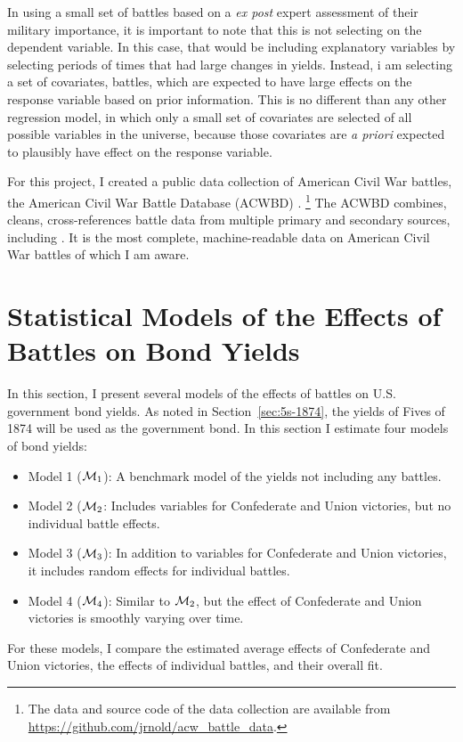 In using a small set of battles based on a \textit{ex post} expert assessment of their military importance, it is important to note that this is not selecting on the dependent variable.
In this case, that would be including explanatory variables by selecting periods of times that had large changes in yields.
Instead, i am selecting a set of covariates, \ie{} battles, which are expected to have large effects on the response variable based on prior information.
This is no different than any other regression model, in which only a small set of covariates are selected of all possible variables in the universe, because those covariates are \textit{a priori} expected to plausibly have effect on the response variable.

For this project, I created a public data collection of American Civil War battles, the American Civil War Battle Database (ACWBD) \parencite{Arnold2015b}.%
\footnote{The data and source code of the data collection are available from \url{https://github.com/jrnold/acw_battle_data}.}
The ACWBD combines, cleans, cross-references battle data from multiple primary and secondary sources, including \textcites{Phisterer1883}{Livermore1900}{Bodart1908}{dyer1908_war_rebel}{KennedyConservation1998}{CWSAC1993}{cwsac2012}.
It is the most complete, machine-readable data on American Civil War battles of which I am aware.



\section{Statistical Models of the Effects of Battles on Bond Yields}
\label{sec:model-war-events}

In this section, I present several models of the effects of battles on U.S. government bond yields.
As noted in Section~\ref{sec:5s-1874}, the yields of Fives of 1874 will be used as the government bond.
In this section I estimate four models of bond yields:
\begin{itemize}
\item Model 1 ($\mathcal{M}_{\text{1}}$): A benchmark model of the yields not including any battles.
\item Model 2 ($\mathcal{M}_{\text{2}}$: Includes variables for Confederate and Union victories, but no individual battle effects.
\item Model 3 ($\mathcal{M}_{\text{3}}$): In addition to variables for Confederate and Union victories, it includes random effects for individual battles.
\item Model 4 ($\mathcal{M}_{\text{4}}$): Similar to $\mathcal{M}_{\text{2}}$, but the effect of Confederate and Union victories is smoothly varying over time.
\end{itemize}
For these models, I compare the estimated average effects of Confederate and Union victories, the effects of individual battles, and their overall fit.

